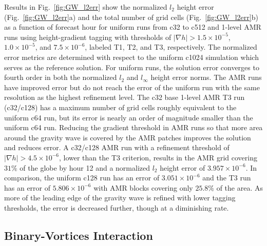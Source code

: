 %
Results in 
Fig.~\ref{fig:GW_l2err} show the normalized $l_2$ height error
(Fig.~\ref{fig:GW_l2err}a) and the total number of grid cells
(Fig.~\ref{fig:GW_l2err}b) as a function of forecast hour for uniform runs from c32 to
c512 and 1-level AMR runs using height-gradient tagging with thresholds
of $|\nabla h| > 1.5\times 10^{-5}$, $1.0\times 10^{-5}$, and 
$7.5 \times 10^{-6}$, labeled T1, T2, and T3, respectively. The normalized error metrics
are determined with respect to the uniform c1024 simulation which serves as the reference solution.  For
uniform runs, the solution error converges to fourth order in both the
normalized $l_2$ and $l_\infty$ height error norms.  The AMR runs
have improved error but do not reach the error of the uniform
run with the same resolution as the highest refinement level.  The c32
base 1-level AMR T3 run (c32/c128) has a maximum number of grid cells
roughly equivalent to the uniform c64 run, but its error is nearly an
order of magnitude smaller than the uniform c64 run.  Reducing the
gradient threshold in AMR runs so that more area around the gravity wave
is covered by the AMR patches improves the solution and reduces error.
A c32/c128 AMR run with a refinement threshold of 
$|\nabla h| > 4.5 \times 10^{-6}$, lower than the T3 criterion, 
results in the AMR grid
covering $31\%$ of the globe by hour 12 and a normalized $l_2$
height error of $3.957\times10^{-6}$.  In comparison, the uniform c128
run has an error of $3.051\times 10^{-6}$ and the T3 run has an error
of $5.806\times 10^{-6}$ with AMR blocks covering only $25.8\%$ of
the area.  As more of the leading edge of the gravity wave is refined
with lower tagging thresholds, the error is decreased further,
though at a diminishing rate.

\subsection{Binary-Vortices Interaction} 
\label{subsec:binary-vortices}

